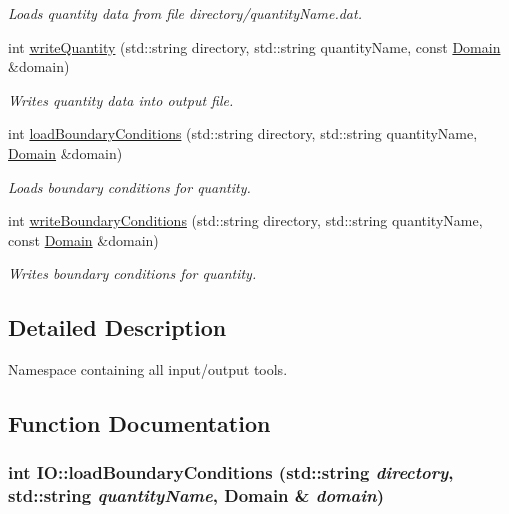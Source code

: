 \begin{DoxyCompactItemize}
\begin{DoxyCompactList}\small\item\em Loads quantity data from file directory/quantityName.dat. \item\end{DoxyCompactList}\item 
int \hyperlink{namespaceIO_a98f43edfc02e8c62ca9f005a9994ab69}{writeQuantity} (std::string directory, std::string quantityName, const \hyperlink{classDomain}{Domain} \&domain)
\begin{DoxyCompactList}\small\item\em Writes quantity data into output file. \item\end{DoxyCompactList}\item 
int \hyperlink{namespaceIO_a71dbd4f86b34210a0d9837185032f845}{loadBoundaryConditions} (std::string directory, std::string quantityName, \hyperlink{classDomain}{Domain} \&domain)
\begin{DoxyCompactList}\small\item\em Loads boundary conditions for quantity. \item\end{DoxyCompactList}\item 
int \hyperlink{namespaceIO_a07f46c0c99961c52b5f6410a84d58a64}{writeBoundaryConditions} (std::string directory, std::string quantityName, const \hyperlink{classDomain}{Domain} \&domain)
\begin{DoxyCompactList}\small\item\em Writes boundary conditions for quantity. \item\end{DoxyCompactList}\end{DoxyCompactItemize}


\subsection{Detailed Description}
Namespace containing all input/output tools. 

\subsection{Function Documentation}
\hypertarget{namespaceIO_a71dbd4f86b34210a0d9837185032f845}{
\subsubsection[{loadBoundaryConditions}]{\setlength{\rightskip}{0pt plus 5cm}int IO::loadBoundaryConditions (std::string {\em directory}, \/  std::string {\em quantityName}, \/  {\bf Domain} \& {\em domain})}}
\label{namespaceIO_a71dbd4f86b34210a0d9837185032f845}


